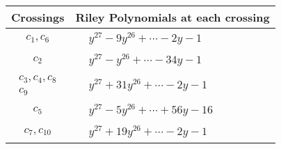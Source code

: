 \documentclass[1p]{elsarticle_modified}
\theoremstyle{definition}
\begin{document}
\begin{tabular}{m{50pt}|m{274pt}}
Crossings & \hspace{64pt}Riley Polynomials at each crossing \\
\hline $$\begin{aligned}c_{1},c_{6}\end{aligned}$$&$\begin{aligned}
&y^{27}-9 y^{26}+\cdots-2 y-1
\end{aligned}$\\
\hline $$\begin{aligned}c_{2}\end{aligned}$$&$\begin{aligned}
&y^{27}- y^{26}+\cdots-34 y-1
\end{aligned}$\\
\hline $$\begin{aligned}c_{3},c_{4},c_{8}\\c_{9}\end{aligned}$$&$\begin{aligned}
&y^{27}+31 y^{26}+\cdots-2 y-1
\end{aligned}$\\
\hline $$\begin{aligned}c_{5}\end{aligned}$$&$\begin{aligned}
&y^{27}-5 y^{26}+\cdots+56 y-16
\end{aligned}$\\
\hline $$\begin{aligned}c_{7},c_{10}\end{aligned}$$&$\begin{aligned}
&y^{27}+19 y^{26}+\cdots-2 y-1
\end{aligned}$\\
\hline
\end{tabular}
\vskip 2pc
\end{document}
